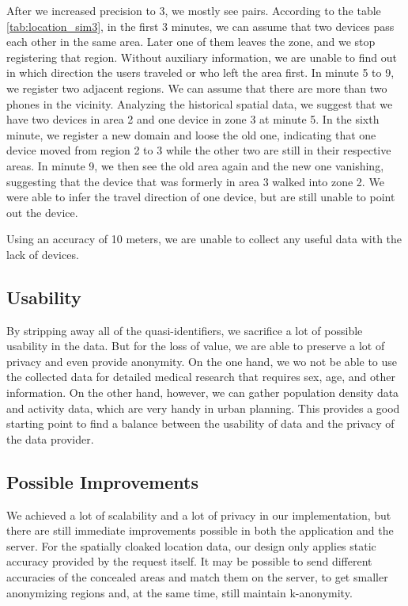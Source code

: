 After we increased precision to 3, we mostly see pairs. According to the table \ref{tab:location_sim3}, in the first 3 minutes, we can assume that two devices pass each other in the same area. Later one of them leaves the zone, and we stop registering that region. Without auxiliary information, we are unable to find out in which direction the users traveled or who left the area first. In minute 5 to 9, we register two adjacent regions. We can assume that there are more than two phones in the vicinity. Analyzing the historical spatial data, we suggest that we have two devices in area 2 and one device in zone 3 at minute 5. In the sixth minute, we register a new domain and loose the old one, indicating that one device moved from region 2 to 3 while the other two are still in their respective areas. In minute 9, we then see the old area again and the new one vanishing, suggesting that the device that was formerly in area 3 walked into zone 2. We were able to infer the travel direction of one device, but are still unable to point out the device.

Using an accuracy of 10 meters, we are unable to collect any useful data with the lack of devices.

\subsection{Usability}
By stripping away all of the quasi-identifiers, we sacrifice a lot of possible usability in the data. But for the loss of value, we are able to preserve a lot of privacy and even provide anonymity. On the one hand, we wo not be able to use the collected data for detailed medical research that requires sex, age, and other information. On the other hand, however, we can gather population density data and activity data, which are very handy in urban planning. This provides a good starting point to find a balance between the usability of data and the privacy of the data provider.

\subsection{Possible Improvements}
We achieved a lot of scalability and a lot of privacy in our implementation, but there are still immediate improvements possible in both the application and the server. For the spatially cloaked location data, our design only applies static accuracy provided by the request itself. It may be possible to send different accuracies of the concealed areas and match them on the server, to get smaller anonymizing regions and, at the same time, still maintain k-anonymity.

